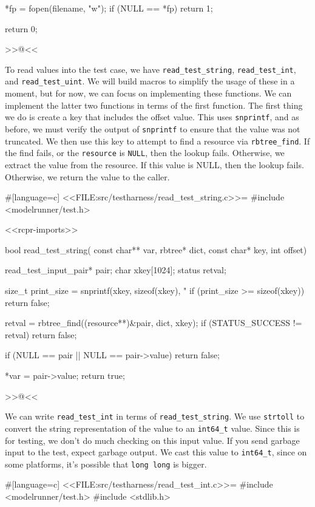 {{    *fp = fopen(filename, "w");
    if (NULL == *fp)
    {
        return 1;
    }

    return 0;
}
>>@<<

\newpage

To read values into the test case, we have \verb/read_test_string/,
\verb/read_test_int/, and \verb/read_test_uint/. We will build macros to
simplify the usage of these in a moment, but for now, we can focus on
implementing these functions. We can implement the latter two functions in terms
of the first function. The first thing we do is create a key that includes the
offset value. This uses \verb/snprintf/, and as before, we must verify the
output of \verb/snprintf/ to ensure that the value was not truncated. We then
use this key to attempt to find a resource via \verb/rbtree_find/. If the find
fails, or the \verb/resource/ is \verb/NULL/, then the lookup fails. Otherwise,
we extract the value from the resource. If this value is NULL, then the lookup
fails.  Otherwise, we return the value to the caller.

#[language=c]
<<FILE:src/testharness/read_test_string.c>>=
#include <modelrunner/test.h>

<<rcpr-imports>>

bool read_test_string(
    const char** var, rbtree* dict, const char* key, int offset)
{
    read_test_input_pair* pair;
    char xkey[1024];
    status retval;

    size_t print_size = snprintf(xkey, sizeof(xkey), "%
    if (print_size >= sizeof(xkey))
    {
        return false;
    }

    retval = rbtree_find((resource**)&pair, dict, xkey);
    if (STATUS_SUCCESS != retval)
    {
        return false;
    }

    if (NULL == pair || NULL == pair->value)
    {
        return false;
    }

    *var = pair->value;
    return true;
}
>>@<<

\newpage

We can write \verb/read_test_int/ in terms of \verb/read_test_string/. We use
\verb/strtoll/ to convert the string representation of the value to an
\verb/int64_t/ value. Since this is for testing, we don't do much checking on
this input value. If you send garbage input to the test, expect garbage output.
We cast this value to \verb/int64_t/, since on some platforms, it's possible
that \verb/long long/ is bigger.

#[language=c]
<<FILE:src/testharness/read_test_int.c>>=
#include <modelrunner/test.h>
#include <stdlib.h>

}
